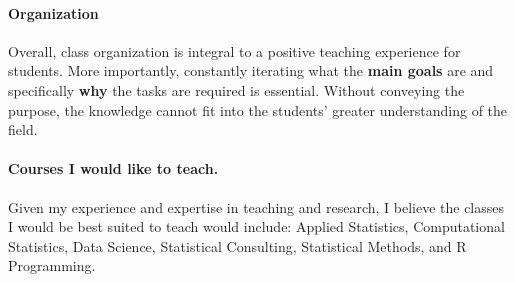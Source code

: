 \documentclass[12pt,a4paper]{article}
\begin{document}
\vspace{-1em}
\paragraph{Organization} Overall, class organization is integral to a positive teaching experience for students.  More importantly, constantly iterating what the {\bf main goals} are and specifically {\bf why} the tasks are required is essential.  Without conveying the purpose, the knowledge cannot fit into the students' greater understanding of the field.

\vspace{-1em}
\paragraph{Courses I would like to teach.} Given my experience and expertise in teaching and research, I believe the classes I would be best suited to teach would include: Applied Statistics, Computational Statistics, Data Science, Statistical Consulting, Statistical Methods, and R Programming.  
\end{document}
